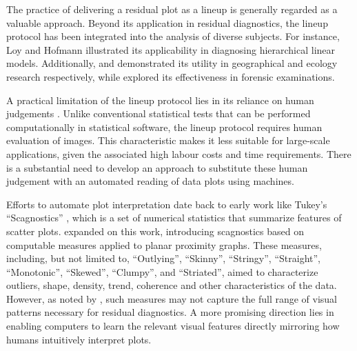 \documentclass[]{interact}
\theoremstyle{plain}%
\theoremstyle{definition}
\theoremstyle{remark}
\begin{document}
The practice of delivering a residual plot as a lineup is generally
regarded as a valuable approach. Beyond its application in residual
diagnostics, the lineup protocol has been integrated into the analysis
of diverse subjects. For instance, Loy and Hofmann
\citetext{\citeyear{loy2013diagnostic}; \citeyear{loy2014hlmdiag}; \citeyear{loy2015you}}
illustrated its applicability in diagnosing hierarchical linear models.
Additionally, \citet{widen2016graphical} and \citet{fieberg2024using}
demonstrated its utility in geographical and ecology research
respectively, while \citet{krishnan2021hierarchical} explored its
effectiveness in forensic examinations.

A practical limitation of the lineup protocol lies in its reliance on
human judgements \citep[see][ about the practical
limitations]{li2024plot}. Unlike conventional statistical tests that can
be performed computationally in statistical software, the lineup
protocol requires human evaluation of images. This characteristic makes
it less suitable for large-scale applications, given the associated high
labour costs and time requirements. There is a substantial need to
develop an approach to substitute these human judgement with an
automated reading of data plots using machines.

Efforts to automate plot interpretation date back to early work like
Tukey's ``Scagnostics'' \citep{tukey1985computer}, which is a set of
numerical statistics that summarize features of scatter plots.
\citet{wilkinson2005graph} expanded on this work, introducing
scagnostics based on computable measures applied to planar proximity
graphs. These measures, including, but not limited to, ``Outlying'',
``Skinny'', ``Stringy'', ``Straight'', ``Monotonic'', ``Skewed'',
``Clumpy'', and ``Striated'', aimed to characterize outliers, shape,
density, trend, coherence and other characteristics of the data.
However, as noted by \citet{buja2009statistical}, such measures may not
capture the full range of visual patterns necessary for residual
diagnostics. A more promising direction lies in enabling computers to
learn the relevant visual features directly mirroring how humans
intuitively interpret plots.
\end{document}
